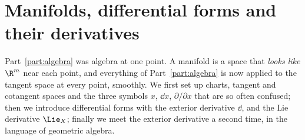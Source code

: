 \clearpage
\part{Manifolds, differential forms and their derivatives}\label{part:manifolds}

Part~\ref{part:algebra} was algebra at one point. A manifold is a space that \emph{looks like} $\R^m$ near each point, and
everything of Part~\ref{part:algebra} is now applied to the tangent space at every point, smoothly. We first set up charts,
tangent and cotangent spaces and the three symbols $x$, $\dd x$, $\partial/\partial x$ that are so often confused; then we
introduce differential forms with the exterior derivative $\dd$, and the Lie derivative $\Lie_X$; finally we meet the exterior
derivative a second time, in the language of geometric algebra.






